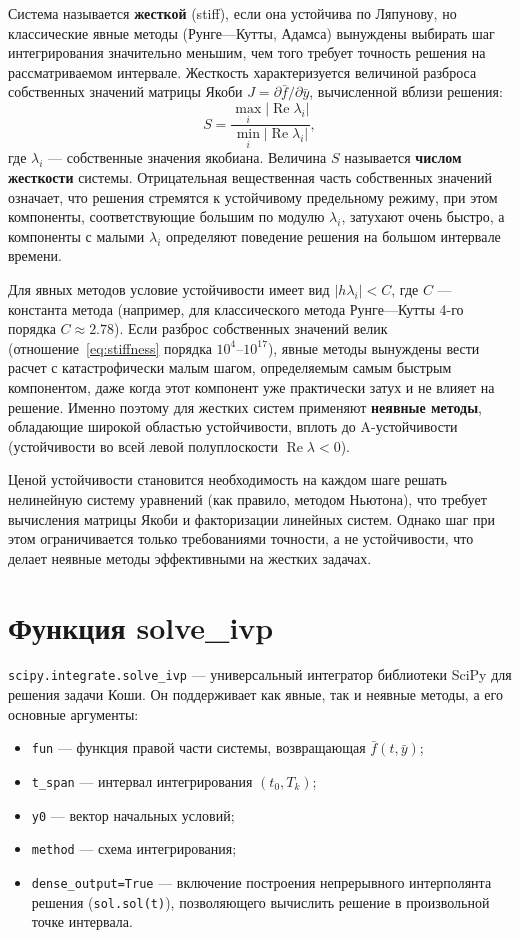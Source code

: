 ﻿\documentclass[a4paper]{article}
\newcommand{\subsectiontext}[1]{%
    \section*{\fontsize{13pt}{0pt}\selectfont\textbf{#1}}%
}
\begin{document}
Система называется \textbf{жесткой} (stiff), если она устойчива по Ляпунову, но классические явные методы (Рунге---Кутты, Адамса) вынуждены выбирать шаг интегрирования значительно меньшим, чем того требует точность решения на рассматриваемом интервале. Жесткость характеризуется величиной разброса собственных значений матрицы Якоби $J = \partial \bar{f} / \partial \bar{y}$, вычисленной вблизи решения:
\begin{equation}
    \label{eq:stiffness}
    S = \frac{\max_i |\operatorname{Re} \lambda_i|}{\min_i |\operatorname{Re} \lambda_i|},
\end{equation}
где $\lambda_i$ --- собственные значения якобиана. Величина $S$ называется \textbf{числом жесткости} системы. Отрицательная вещественная часть собственных значений означает, что решения стремятся к устойчивому предельному режиму, при этом компоненты, соответствующие большим по модулю $\lambda_i$, затухают очень быстро, а компоненты с малыми $\lambda_i$ определяют поведение решения на большом интервале времени.

Для явных методов условие устойчивости имеет вид $|h \lambda_i| < C$, где $C$ --- константа метода (например, для классического метода Рунге---Кутты 4-го порядка $C \approx 2.78$). Если разброс собственных значений велик (отношение~\eqref{eq:stiffness} порядка $10^4$--$10^{17}$), явные методы вынуждены вести расчет с катастрофически малым шагом, определяемым самым быстрым компонентом, даже когда этот компонент уже практически затух и не влияет на решение. Именно поэтому для жестких систем применяют \textbf{неявные методы}, обладающие широкой областью устойчивости, вплоть до A-устойчивости (устойчивости во всей левой полуплоскости $\operatorname{Re} \lambda < 0$).

Ценой устойчивости становится необходимость на каждом шаге решать нелинейную систему уравнений (как правило, методом Ньютона), что требует вычисления матрицы Якоби и факторизации линейных систем. Однако шаг при этом ограничивается только требованиями точности, а не устойчивости, что делает неявные методы эффективными на жестких задачах.

\subsectiontext{Функция solve\_ivp}

\texttt{scipy.integrate.solve\_ivp} --- универсальный интегратор библиотеки SciPy для решения задачи Коши. Он поддерживает как явные, так и неявные методы, а его основные аргументы:
\begin{itemize}
    \item \texttt{fun} --- функция правой части системы, возвращающая $\bar{f}(t, \bar{y})$;
    \item \texttt{t\_span} --- интервал интегрирования $(t_0, T_k)$;
    \item \texttt{y0} --- вектор начальных условий;
    \item \texttt{method} --- схема интегрирования;
    \item \texttt{dense\_output=True} --- включение построения непрерывного интерполянта решения (\texttt{sol.sol(t)}), позволяющего вычислить решение в произвольной точке интервала.
\end{itemize}
\end{document}
